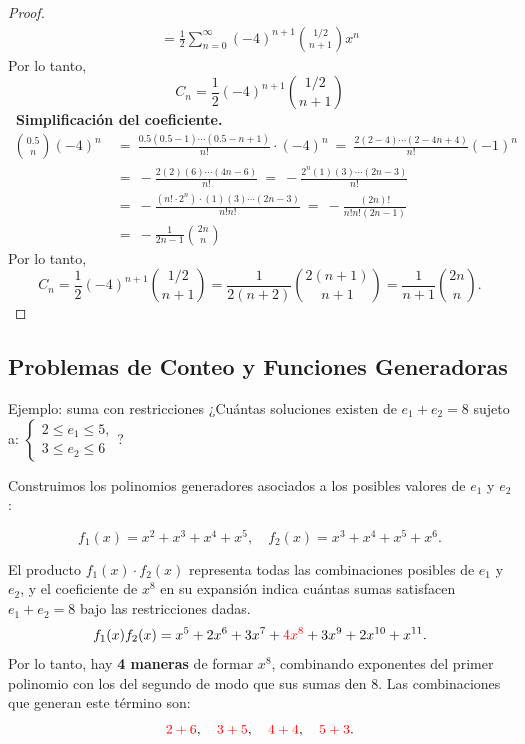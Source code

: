 \begin{proof}
\begin{align*}
=\frac{1}{2}\sum_{n = 0}^{\infty} (-4)^{n+1} \binom{1/2}{n+1} x^{n}
\end{align*} 
Por lo tanto, 
$$
C_n =  \frac{1}{2}(-4)^{n+1} \binom{1/2}{n+1} 
$$
\textbf{~Simplificación del coeficiente.}  
  \begin{align*}
      \binom{0.5}{n}(-4)^n &~=~ \frac{0.5(0.5-1)\cdots (0.5-n+1)}{n!}\cdot (-4)^n
       ~=~ \frac{2(2-4)\cdots (2-4n+4)}{n!}(-1)^n\\
      & ~=~ -\frac{2(2)(6)\cdots (4n-6)}{n!}
      ~=~ -\frac{2^n(1)(3)\cdots (2n-3)}{n!}\\
      &  ~=~ -\frac{(n!\cdot 2^n)\cdot (1)(3)\cdots (2n-3)}{n!n!}
     ~=~ -\frac{(2n)!}{n!n!(2n-1)}\\
        & ~=~ - \frac{1}{2n-1}\binom{2n}{n}
    \end{align*} 
Por lo tanto,
$$
C_n = \frac{1}{2}(-4)^{n+1} \binom{1/2}{n+1}  = \frac{1}{2(n+2)} \binom{2(n+1)}{n+1} = \frac{1}{n+1} \binom{2n}{n}.
$$
\end{proof}


\subsection{Problemas de Conteo y Funciones Generadoras}

\begin{exampleblock}{Ejemplo: suma con restricciones}
¿Cuántas soluciones existen de $e_1 + e_2 = 8$ sujeto a:
$\left\{\begin{array}{l} 2\leq e_1\leq 5,\\ 3\leq e_2\leq 6\end{array}\right.$?

Construimos los polinomios generadores asociados a los posibles valores de $e_1$ y $e_2$:

\[
f_1(x) = x^2 + x^3 + x^4 + x^5, \quad f_2(x) = x^3 + x^4 + x^5 + x^6.
\]

El producto $f_1(x) \cdot f_2(x)$ representa todas las combinaciones posibles de $e_1$ y $e_2$, y el coeficiente de $x^8$ en su expansión indica cuántas sumas satisfacen $e_1 + e_2 = 8$ bajo las restricciones dadas.
$$
f_1(x) f_2(x) = x^5 + 2x^6 + 3x^7 + \textcolor{red}{4x^8} + 3x^9 + 2x^{10} + x^{11}.
$$
Por lo tanto, hay \textbf{4 maneras} de formar $x^8$, combinando exponentes del primer polinomio con los del segundo de modo que sus sumas den $8$. Las combinaciones que generan este término son:
\[
\textcolor{red}{2+6}, \quad \textcolor{red}{3+5}, \quad \textcolor{red}{4+4}, \quad \textcolor{red}{5+3}.
\]
\end{exampleblock}

